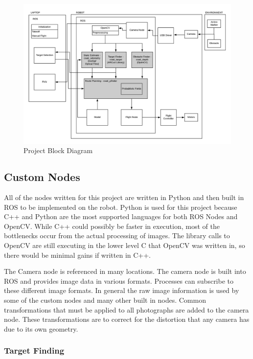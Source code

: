 \documentclass{article}[12]
\begin{document}
	\begin{figure}[H]
		\centering
		\includegraphics[width=\linewidth]{BlockDiagram}
		\caption{Project Block Diagram}
		\label{fig:blockdiagram}
	\end{figure}

	\subsection{Custom Nodes}
	
 All of the nodes written for this project are written in Python and then built in ROS to be implemented on the robot. Python is used for this project because C++ and Python are the most supported languages for both ROS Nodes and OpenCV. While C++ could possibly be faster in execution, most of the bottlenecks occur from the actual processing of images. The library calls to OpenCV are still executing in the lower level C that OpenCV was written in, so there would be minimal gains if written in C++.
 
 The Camera node is referenced in many locations. The camera node is built into ROS and provides image data in various formats. Processes can subscribe to these different image formats. In general the raw image information is used by some of the custom nodes and many other built in nodes. Common transformations that must be applied to all photographs are added to the camera node. These transformations are to correct for the distortion that any camera has due to its own geometry.
	
	\subsubsection{Target Finding}
	
\end{document}
